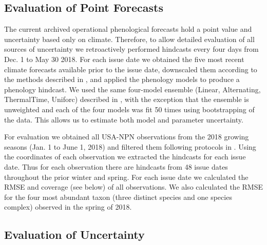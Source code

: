 \documentclass[fleqn,10pt,lineno]{wlpeerj}
\begin{document}
\subsection*{Evaluation of Point Forecasts}

The current archived operational phenological forecasts hold a point value and uncertainty based only on climate. Therefore, to allow detailed evaluation of all sources of uncertainty we retroactively performed hindcasts every four days from Dec. 1 to May 30 2018. For each issue date we obtained the five most recent climate forecasts available prior to the issue date, downscaled them according to the methods described in \cite{taylor2020a}, and applied the phenology models to produce a phenology hindcast. We used the same four-model ensemble (Linear, Alternating, ThermalTime, Uniforc) described in \cite{taylor2020a}, with the exception that the ensemble is unweighted and each of the four models was fit 50 times using bootstrapping of the data. This allows us to estimate both model and parameter uncertainty.  

For evaluation we obtained all USA-NPN observations from the 2018 growing seasons (Jan. 1 to June 1, 2018) and filtered them following protocols in \cite{taylor2020a}. Using the coordinates of each observation we extracted the hindcasts for each issue date. Thus for each observation there are hindcasts from 48 issue dates throughout the prior winter and spring. For each issue date we calculated the RMSE and coverage (see below) of all observations. We also calculated the RMSE for the four most abundant taxon (three distinct species and one species complex) observed in the spring of 2018.

\subsection*{Evaluation of Uncertainty}
\end{document}
